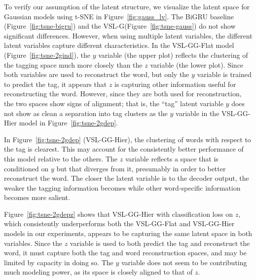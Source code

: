 \documentclass[11pt,a4paper]{article}
\newcommand{\vsmg}{VSL-G\xspace}
\newcommand{\vsmggflat}{VSL-GG-Flat\xspace}
\newcommand{\vsmgghier}{VSL-GG-Hier\xspace}
\begin{document}
To verify our assumption of the latent structure, we visualize the latent space for Gaussian models using t-SNE \cite{maaten2008visualizing} in Figure~\ref{fig:gauss_lv}. The BiGRU baseline (Figure~\ref{fig:tsne-bigru}) and the \vsmg (Figure~\ref{fig:tsne-gauss}) do not show significant differences. However, when using multiple latent variables, the different latent variables capture different characteristics. In the \vsmggflat model (Figure~\ref{fig:tsne-2gind}), the $y$ variable (the upper plot) reflects the clustering of the tagging space much more closely than the $z$ variable (the lower plot). Since both variables are used to reconstruct the word, but only the $y$ variable is trained to predict the tag, it appears that $z$ is capturing other information useful for reconstructing the word.
However, since they are both used for reconstruction, the two spaces show signs of alignment; that is, the ``tag'' latent variable $y$ does not show as clean a separation into tag clusters as the $y$ variable in the \vsmgghier model in Figure~\ref{fig:tsne-2gdep}.

In Figure~\ref{fig:tsne-2gdep} (\vsmgghier), the clustering of words with respect to the tag is clearest.
This may account for the consistently better performance of this model relative to the others. The $z$ variable reflects a space that is conditioned on $y$
but that diverges from it, presumably in order to better reconstruct the word.
The closer the latent variable is to the decoder output, the weaker the tagging information becomes while other word-specific information becomes more salient.

Figure~\ref{fig:tsne-2gdepz} shows that \vsmgghier with classification loss on $z$, which consistently underperforms both the \vsmggflat and \vsmgghier models in our experiments, appears to be capturing the same latent space in both variables. Since the $z$ variable is used to both predict the tag and reconstruct the word, it must capture both the tag and word reconstruction spaces, and may be limited by capacity in doing so. The $y$ variable does not seem to be contributing much modeling power, as its space is closely aligned to that of $z$.
\end{document}
